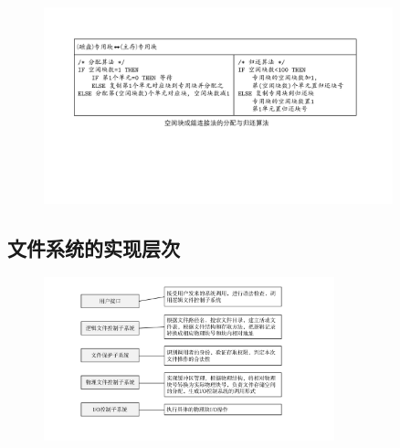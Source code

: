 \documentclass[cs4size,a4paper,10pt]{ctexart}
\begin{document}
	\begin{figure}[H]
		\centering
		\includegraphics[width=0.9\textwidth]{img/5.6.1.2.2}
	\end{figure}

	\subsection{文件系统的实现层次}
	\begin{figure}[H]
		\centering
		\includegraphics[width=0.75\textwidth]{img/5.6.2}
	\end{figure}
\end{document}
